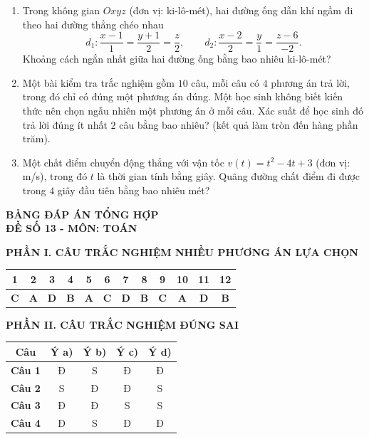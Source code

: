 \documentclass[12pt,a4paper]{article}
\begin{document}
\begin{enumerate}[label=\textbf{Câu \arabic*:}, leftmargin=*]
\item Trong không gian $Oxyz$ (đơn vị: ki-lô-mét), hai đường ống dẫn khí ngầm đi theo hai đường thẳng chéo nhau
\[
d_1: \dfrac{x - 1}{1} = \dfrac{y + 1}{2} = \dfrac{z}{2}, \qquad d_2: \dfrac{x - 2}{2} = \dfrac{y}{1} = \dfrac{z - 6}{-2}.
\]
Khoảng cách ngắn nhất giữa hai đường ống bằng bao nhiêu ki-lô-mét?

\item Một bài kiểm tra trắc nghiệm gồm $10$ câu, mỗi câu có $4$ phương án trả lời, trong đó chỉ có đúng một phương án đúng. Một học sinh không biết kiến thức nên chọn ngẫu nhiên một phương án ở mỗi câu. Xác suất để học sinh đó trả lời đúng ít nhất $2$ câu bằng bao nhiêu? (kết quả làm tròn đến hàng phần trăm).

\item Một chất điểm chuyển động thẳng với vận tốc $v(t) = t^2 - 4t + 3$ (đơn vị: m/s), trong đó $t$ là thời gian tính bằng giây. Quãng đường chất điểm đi được trong $4$ giây đầu tiên bằng bao nhiêu mét?

\end{enumerate}

\newpage
\begin{center}
    {\Large\textbf{BẢNG ĐÁP ÁN TỔNG HỢP}}\\[4pt]
    \textbf{ĐỀ SỐ 13 - MÔN: TOÁN}
\end{center}
\vspace{0.3cm}

\noindent\textbf{\large PHẦN I. CÂU TRẮC NGHIỆM NHIỀU PHƯƠNG ÁN LỰA CHỌN}
\begin{center}
\renewcommand{\arraystretch}{1.25}
\begin{tabular}{|c|c|c|c|c|c|c|c|c|c|c|c|}
\hline
\textbf{1} & \textbf{2} & \textbf{3} & \textbf{4} & \textbf{5} & \textbf{6} & \textbf{7} & \textbf{8} & \textbf{9} & \textbf{10} & \textbf{11} & \textbf{12} \\ \hline
\textbf{C} & \textbf{A} & \textbf{D} & \textbf{B} & \textbf{A} & \textbf{C} & \textbf{D} & \textbf{B} & \textbf{C} & \textbf{A} & \textbf{D} & \textbf{B} \\ \hline
\end{tabular}
\end{center}

\vspace{0.3cm}
\noindent\textbf{\large PHẦN II. CÂU TRẮC NGHIỆM ĐÚNG SAI}
\begin{center}
\renewcommand{\arraystretch}{1.25}
\begin{tabular}{|c|c|c|c|c|}
\hline
\textbf{Câu} & \textbf{Ý a)} & \textbf{Ý b)} & \textbf{Ý c)} & \textbf{Ý d)} \\ \hline
\textbf{Câu 1} & Đ & S & Đ & Đ \\ \hline
\textbf{Câu 2} & S & Đ & Đ & S \\ \hline
\textbf{Câu 3} & Đ & Đ & S & S \\ \hline
\textbf{Câu 4} & Đ & S & Đ & Đ \\ \hline
\end{tabular}
\end{center}
\end{document}
